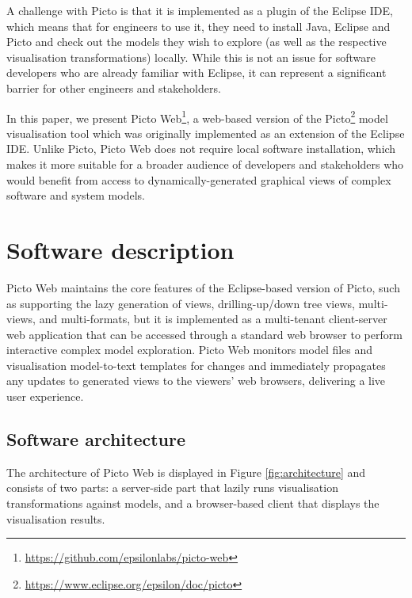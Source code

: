 \documentclass[preprint,12pt, a4paper]{elsarticle}
\begin{document}
A challenge with Picto is that it is implemented as a plugin of the Eclipse IDE, which means that for engineers to use it, they need to install Java, Eclipse and Picto and check out the models they wish to explore (as well as the respective visualisation transformations) locally. While this is not an issue for software developers who are already familiar with Eclipse, it can represent a significant barrier for other engineers and stakeholders. 

In this paper, we present Picto Web\footnote{\url{https://github.com/epsilonlabs/picto-web}}, a web-based version of the Picto\footnote{\url{https://www.eclipse.org/epsilon/doc/picto}} \cite{dimitris2020picto} model visualisation tool which was originally implemented as an extension of the Eclipse IDE. Unlike Picto, Picto Web does not require local software installation, which makes it more suitable for a broader audience of developers and stakeholders who would benefit from access to dynamically-generated graphical views of complex software and system models.

\section{Software description}
Picto Web maintains the core features of the Eclipse-based version of Picto, such as supporting the lazy generation of views, drilling-up/down tree views, multi-views, and multi-formats, but it is implemented as a multi-tenant client-server web application that can be accessed through a standard web browser to perform interactive complex model exploration. 
Picto Web monitors model files and visualisation model-to-text templates for changes and immediately propagates any updates to generated views to the viewers' web browsers, delivering a live user experience.

\subsection{Software architecture}
The architecture of Picto Web is displayed in Figure \ref{fig:architecture} and consists of two parts: a server-side part that lazily runs visualisation transformations against models, and a browser-based client that displays the visualisation results. 
\end{document}
